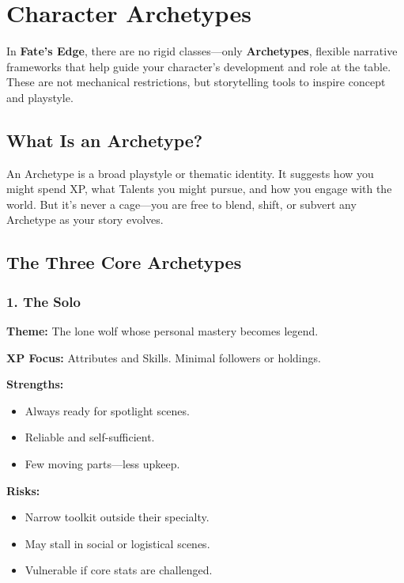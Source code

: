 
\chapter{Character Archetypes}
\label{ch:archetypes}

In \textbf{Fate's Edge}, there are no rigid classes—only \textbf{Archetypes}, flexible narrative frameworks that help guide your character's development and role at the table. These are not mechanical restrictions, but storytelling tools to inspire concept and playstyle.

\section{What Is an Archetype?}

An Archetype is a broad playstyle or thematic identity. It suggests how you might spend XP, what Talents you might pursue, and how you engage with the world. But it's never a cage—you are free to blend, shift, or subvert any Archetype as your story evolves.

\section{The Three Core Archetypes}

\subsection*{1. The Solo}

\textbf{Theme:} The lone wolf whose personal mastery becomes legend.

\textbf{XP Focus:} Attributes and Skills. Minimal followers or holdings.

\textbf{Strengths:}
\begin{itemize}
  \item Always ready for spotlight scenes.
  \item Reliable and self-sufficient.
  \item Few moving parts—less upkeep.
\end{itemize}

\textbf{Risks:}
\begin{itemize}
  \item Narrow toolkit outside their specialty.
  \item May stall in social or logistical scenes.
  \item Vulnerable if core stats are challenged.
\end{itemize}

